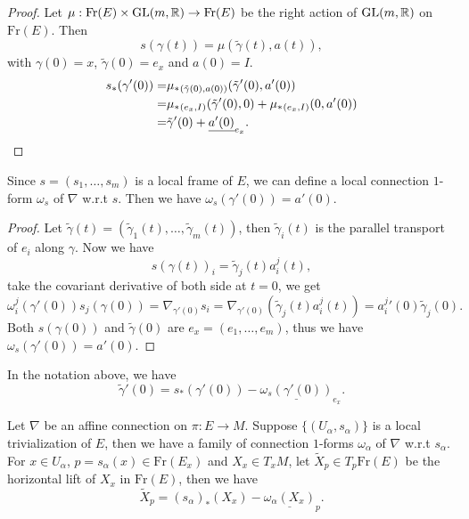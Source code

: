 \begin{proof}
    Let $\mu:\mathrm{Fr}(E)\times\mathrm{GL}(m,\mathbb{R}) \to \mathrm{Fr}(E)$ be 
    the right action of $\mathrm{GL}(m,\mathbb{R})$ on $\mathrm{Fr}(E)$. 
    Then 
    \begin{equation*}
        s(\gamma(t)) = \mu(\tilde{\gamma}(t), a(t)), 
    \end{equation*}
    with $\gamma(0) = x$, $\tilde{\gamma}(0) = e_x$ and $a(0) = I$.
    \begin{align*}
        s_*(\gamma'(0)) =& \mu_*{}_{(\tilde{\gamma}(0), a(0))}(\tilde{\gamma}'(0), a'(0)) \\ 
        =& \mu_*{}_{(e_x, I)}(\tilde{\gamma}'(0), 0) + \mu_*{}_{(e_x, I)}(0, a'(0)) \\ 
        =& \tilde{\gamma}'(0) + \underline{a'(0)}_{e_x}. \qedhere
    \end{align*}
\end{proof}
\begin{lemma}
    Since $s=(s_1, \ldots, s_m)$ is a local frame of $E$, 
    we can define a local connection $1$-form $\omega_s$ of $\nabla$ w.r.t $s$. 
    Then we have $\omega_s(\gamma'(0)) = a'(0)$.
\end{lemma}
\begin{proof}
    Let $\tilde{\gamma}(t)=(\tilde{\gamma}_1(t), \ldots, \tilde{\gamma}_m(t))$, then 
    $\tilde{\gamma}_i(t)$ is the parallel transport of $e_i$ along $\gamma$. Now we have
    \begin{equation*}
        s(\gamma(t))_i = \tilde{\gamma}_j(t)a^j_i(t), 
    \end{equation*}
    take the covariant derivative of both side at $t=0$, we get
    \begin{equation*}
        \omega_i^j(\gamma'(0))s_j(\gamma(0)) = \nabla_{\gamma'(0)}s_i 
        = \nabla_{\gamma'(0)}(\tilde{\gamma}_j(t)a^j_i(t))
        = a_i^j{}'(0)\tilde{\gamma}_j(0). 
    \end{equation*}
    Both $s(\gamma(0))$ and $\tilde{\gamma}(0)$ are $e_x=(e_1, \ldots, e_m)$, 
    thus we have $\omega_s(\gamma'(0)) = a'(0)$.
\end{proof}
\begin{corollary}
    In the notation above, we have
    \begin{equation*}
        \tilde{\gamma}'(0) = s_*(\gamma'(0)) - \underline{\omega_s(\gamma'(0))}_{e_x}.
    \end{equation*}
\end{corollary}
\begin{corollary}
    Let $\nabla$ be an affine connection on $\pi:E\to M$.
    Suppose $\{(U_\alpha, s_\alpha)\}$ is a local trivialization of $E$, 
    then we have a family of connection $1$-forms $\omega_\alpha$ of $\nabla$ w.r.t $s_\alpha$. 
    For $x\in U_\alpha$, $p=s_\alpha(x)\in \mathrm{Fr}(E_x)$ and $X_x\in T_xM$, 
    let $\tilde{X}_p\in T_p\mathrm{Fr}(E)$ be the horizontal lift of $X_x$ in $\mathrm{Fr}(E)$, then we have
    \begin{equation*}
        \tilde{X}_p = (s_\alpha)_*(X_x) - \underline{\omega_\alpha(X_x)}_p.
    \end{equation*}
\end{corollary}
